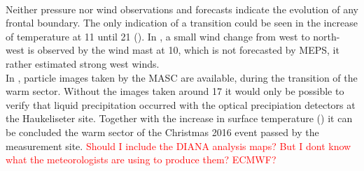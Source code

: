 \\
Neither pressure nor wind observations and forecasts indicate the evolution of any frontal boundary. The only indication of a transition could be seen in the increase of temperature at \SI{11}{\UTC} until \SI{21}{\UTC} (). In , a small wind change from west to north-west is observed by the wind mast at \SI{10}{\UTC}, which is not forecasted by MEPS, it rather estimated strong west winds.
\\
In , particle images taken by the MASC are available, during the transition of the warm sector. Without the images taken around \SI{17}{\UTC} it would only be possible to verify that liquid precipitation occurred with the optical precipiation detectors at the Haukeliseter site. Together with the increase in surface temperature () it can be concluded the warm sector of the Christmas 2016 event passed by the measurement site.
\textcolor{red}{Should I include the DIANA analysis maps? But I dont know what the meteorologists are using to produce them? ECMWF?}
%
